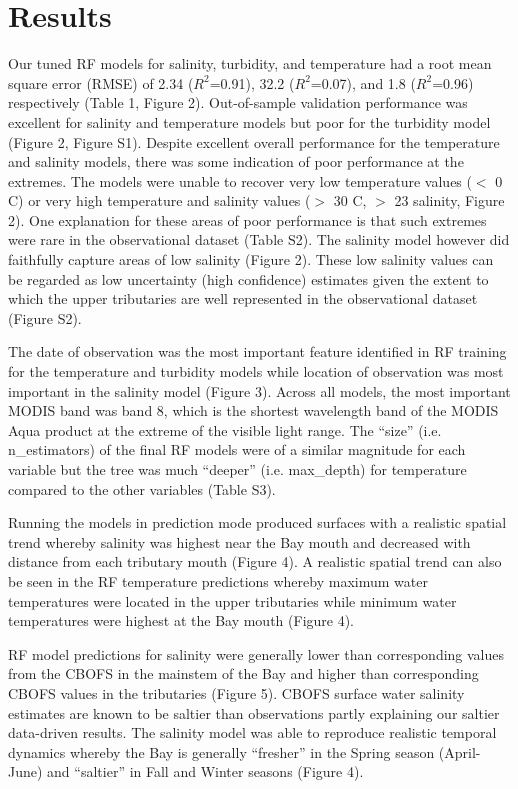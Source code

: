 \documentclass{article}
\begin{document}
\section{Results}

Our tuned RF models for salinity, turbidity, and temperature had a root mean square error (RMSE) of 2.34 ($R^2$=0.91), 32.2 ($R^2$=0.07), and 1.8 ($R^2$=0.96) respectively (Table 1, Figure 2). Out-of-sample validation performance was excellent for salinity and temperature models but poor for the turbidity model (Figure 2, Figure S1). Despite excellent overall performance for the temperature and salinity models, there was some indication of poor performance at the extremes. The models were unable to recover very low temperature values ($<$ 0 C) or very high temperature and salinity values ($>$ 30 C, $>$ 23 salinity, Figure 2). One explanation for these areas of poor performance is that such extremes were rare in the observational dataset (Table S2). The salinity model however did faithfully capture areas of low salinity (Figure 2). These low salinity values can be regarded as low uncertainty (high confidence) estimates given the extent to which the upper tributaries are well represented in the observational dataset (Figure S2).

The date of observation was the most important feature identified in RF training for the temperature and turbidity models while location of observation was most important in the salinity model (Figure 3). Across all models, the most important MODIS band was band 8, which is the shortest wavelength band of the MODIS Aqua product at the extreme of the visible light range. The “size” (i.e. n\_estimators) of the final RF models were of a similar magnitude for each variable but the tree was much “deeper” (i.e. max\_depth) for temperature compared to the other variables (Table S3).

Running the models in prediction mode produced surfaces with a realistic spatial trend whereby salinity was highest near the Bay mouth and decreased with distance from each tributary mouth (Figure 4). A realistic spatial trend can also be seen in the RF temperature predictions whereby maximum water temperatures were located in the upper tributaries while minimum water temperatures were highest at the Bay mouth (Figure 4).

RF model predictions for salinity were generally lower than corresponding values from the CBOFS in the mainstem of the Bay and higher than corresponding CBOFS values in the tributaries (Figure 5). CBOFS surface water salinity estimates are known to be saltier than observations \citep{lanerolle2011second, vogelAssessingSatelliteSea2016} partly explaining our saltier data-driven results. The salinity model was able to reproduce realistic temporal dynamics whereby the Bay is generally “fresher” in the Spring season (April-June) and “saltier” in Fall and Winter seasons (Figure 4).
\end{document}
